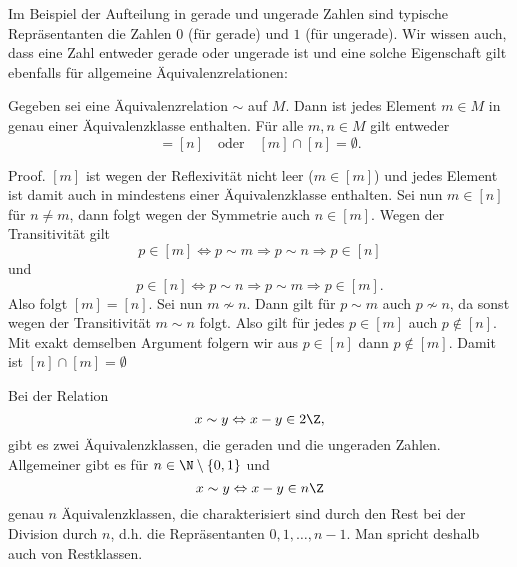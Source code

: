 \documentclass[letterpaper,10pt,english]{jupyterBook}
\begin{document}
Im Beispiel der Aufteilung in gerade und ungerade Zahlen sind typische Repräsentanten die Zahlen \(0\) (für gerade) und \(1\) (für ungerade). Wir wissen auch, dass eine Zahl entweder gerade oder ungerade ist und eine solche Eigenschaft gilt ebenfalls für allgemeine Äquivalenzrelationen:
\label{grundlagen/mengenlogik:lemma-9}
\begin{lemma}{}{}



Gegeben sei eine Äquivalenzrelation \(\sim\) auf \(M\). Dann ist jedes Element \(m \in M\) in genau einer Äquivalenzklasse enthalten. Für alle \(m,n \in M\) gilt entweder
\begin{equation*}
[m] = [n] \quad \text{oder} \quad [m] \cap [n] = \emptyset .
\end{equation*}\end{lemma}

\begin{emphBox}{}{}
Proof.  \([m]\) ist wegen der Reflexivität nicht leer (\(m \in [m]\)) und jedes Element ist damit auch in mindestens einer Äquivalenzklasse enthalten. Sei nun \(m \in [n]\) für \(n \neq m\), dann folgt wegen der Symmetrie auch \(n \in [m]\). Wegen der Transitivität gilt
\begin{equation*}
p \in [m] \Leftrightarrow p \sim m \Rightarrow p \sim n \Rightarrow p \in [n]
\end{equation*}
und
\begin{equation*}
 p \in [n] \Leftrightarrow p \sim n \Rightarrow p \sim m \Rightarrow p \in [m].
\end{equation*}
Also folgt \([m]=[n]\). Sei nun \(m \not\sim n\). Dann gilt für \(p \sim m\) auch \(p \not\sim n\), da sonst wegen der Transitivität \(m \sim n\) folgt. Also gilt für jedes \(p \in [m]\) auch \(p \notin [n]\). Mit exakt demselben Argument folgern wir aus \(p \in [n]\) dann \(p \notin [m]\). Damit ist \([n] \cap [m] = \emptyset\)
\end{emphBox}

Bei der Relation
\begin{equation*}
 x \sim y \Leftrightarrow x-y \in 2 \Z ,
\end{equation*}
gibt es zwei Äquivalenzklassen, die geraden und die ungeraden Zahlen. Allgemeiner gibt es für \(n \in \N \setminus \{0,1\}\) und
\begin{equation*}
x \sim y \Leftrightarrow x - y \in n \Z
\end{equation*}
genau \(n\) Äquivalenzklassen, die charakterisiert sind durch den Rest bei der Division durch \(n\), d.h. die Repräsentanten \(0,1,\ldots,n-1\). Man spricht deshalb auch von Restklassen.
\end{document}
